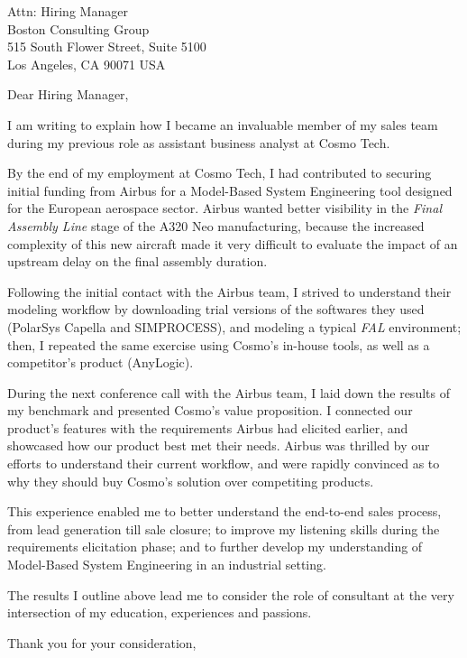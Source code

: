 \documentclass{letter}
\begin{document}
\signature{Marius Peter}

\longindentation=0pt
\address{Marius Peter\\
  1729 E Califon St\\
  Carson CA 90745
}


\begin{letter}{Attn: Hiring Manager\\
    Boston Consulting Group\\
    515 South Flower Street, Suite 5100\\
    Los Angeles, CA 90071 USA}

  \opening{\vfill Dear Hiring Manager,}

  I am writing to explain how I became an invaluable member of my sales team
  during my previous role as assistant business analyst at Cosmo Tech.

  By the end of my employment at Cosmo Tech, I had contributed to securing
  initial funding from Airbus for a Model-Based System Engineering tool designed
  for the European aerospace sector. Airbus wanted better visibility in the
  \textit{Final Assembly Line} stage of the A320 Neo manufacturing, because the
  increased complexity of this new aircraft made it very difficult to evaluate
  the impact of an upstream delay on the final assembly duration.

  Following the initial contact with the Airbus team, I strived to understand
  their modeling workflow by downloading trial versions of the softwares they
  used (PolarSys Capella and SIMPROCESS), and modeling a typical \textit{FAL}
  environment; then, I repeated the same exercise using Cosmo's in-house tools,
  as well as a competitor's product (AnyLogic).

  During the next conference call with the Airbus team, I laid down the results
  of my benchmark and presented Cosmo's value proposition. I connected our
  product's features with the requirements Airbus had elicited earlier, and
  showcased how our product best met their needs. Airbus was thrilled by our
  efforts to understand their current workflow, and were rapidly convinced as to
  why they should buy Cosmo's solution over competiting products.

  This experience enabled me to better understand the end-to-end sales process,
  from lead generation till sale closure; to improve my listening skills during
  the requirements elicitation phase; and to further develop my understanding of
  Model-Based System Engineering in an industrial setting.

  The results I outline above lead me to consider the role of consultant at the
  very intersection of my education, experiences and passions.

 \closing{Thank you for your consideration,}

\end{letter}
\end{document}
